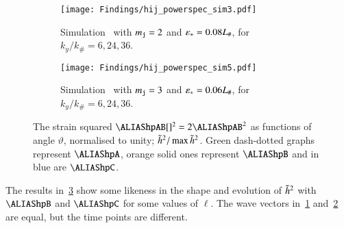
    \begin{figure}[h!]
        \centering
        \begin{subfigure}[b]{\linewidth}
            \centering
            \texttt{[image: Findings/hij\_powerspec\_sim3.pdf]}
        \caption{Simulation~ with $m_{\mathtt{j}}=2$ and $\varepsilon_\ast=0.08L_\#$, for $k_y/k_\#=6,24,36$. }
        \label{fig:results:h11:hij_powerspec_sim3}
        \end{subfigure}
        \hfill
        \begin{subfigure}[b]{\linewidth}
            \texttt{[image: Findings/hij\_powerspec\_sim5.pdf]}
        \caption{Simulation~ with $m_{\mathtt{j}}=3$ and $\varepsilon_\ast=0.06L_\#$, for $k_y/k_\#=6,24,36$.}
        \label{fig:results:h11:hij_powerspec_sim5}
        \end{subfigure}
        \caption{%
        The strain squared $\hpAB[]^2 = 2\hpAB^2$ as functions of angle $\vartheta$, normalised to unity; $\tilde{h}^2/\max{\tilde{h}^2}$. %
        Green dash-dotted graphs represent $\hpA$, orange solid ones represent $\hpB$ and in blue are $\hpC$.}
        \label{fig:results:h11:hij_powerspecs}
    \end{figure}




    The results in~\cref{fig:results:h11:hij_powerspecs} show some likeness in the shape and evolution of $\tilde{h}^2$ with $\hpB$ and $\hpC$ for some values of $\ell$. The wave vectors in~\cref{fig:results:h11:hij_powerspec_sim3} and~\cref{fig:results:h11:hij_powerspec_sim5} are equal, but the time points are different.

    
















